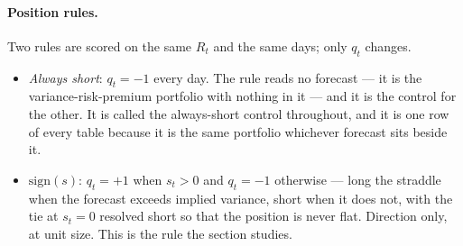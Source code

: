 \paragraph{Position rules.} Two rules are scored on the same $R_t$ and
the same days; only $q_t$ changes.
\begin{itemize}
\itemsep2pt
\item \emph{Always short}: $q_t = -1$ every day. The rule reads no
      forecast --- it is the variance-risk-premium portfolio with nothing
      in it --- and it is the control for the other. It is called the
      always-short control throughout, and it is one row of every table
      because it is the same portfolio whichever forecast sits beside it.
\item \emph{$\mathrm{sign}(s)$}: $q_t = +1$ when $s_t > 0$ and
      $q_t = -1$ otherwise --- long the straddle when the forecast exceeds
      implied variance, short when it does not, with the tie at $s_t = 0$
      resolved short so that the position is never flat. Direction only, at
      unit size. This is the rule the section studies.
\end{itemize}

